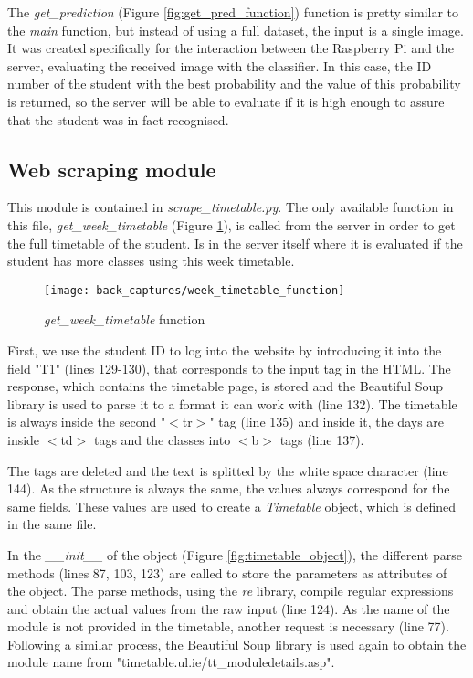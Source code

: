 	\clearpage

	The \textit{get{\_}prediction} (Figure \ref{fig:get_pred_function}) function is pretty similar to the \textit{main} function, but instead of using a full dataset, the input is a single image. It was created specifically for the interaction between the Raspberry Pi and the server, evaluating the received image with the classifier. In this case, the ID number of the student with the best probability and the value of this probability is returned, so the server will be able to evaluate if it is high enough to assure that the student was in fact recognised.

	\subsection{Web scraping module}
	\label{subsec:scraping_module}
	This module is contained in \textit{scrape{\_}timetable.py}. The only available function in this file, \textit{get{\_}week{\_}timetable} (Figure \ref{fig:get_timetable_function}), is called from the server in order to get the full timetable of the student. Is in the server itself where it is evaluated if the student has more classes using this week timetable.

	\begin{figure}[!ht]
		\centering
		\texttt{[image: back\_captures/week\_timetable\_function]}
		\caption{\textit{get{\_}week{\_}timetable} function}
		\label{fig:get_timetable_function}
	\end{figure}

	\clearpage

	First, we use the student ID to log into the website by introducing it into the field "T1" (lines 129-130), that corresponds to the input tag in the HTML. The response, which contains the timetable page, is stored and the Beautiful Soup library is used to parse it to a format it can work with (line 132). The timetable is always inside the second "$<$tr$>$" tag (line 135) and inside it, the days are inside $<$td$>$ tags and the classes into $<$b$>$ tags (line 137). 

	The tags are deleted and the text is splitted by the white space character (line 144). As the structure is always the same, the values always correspond for the same fields. These values are used to create a \textit{Timetable} object, which is defined in the same file. 

	In the \textit{{\_}{\_}init{\_}{\_}} of the object (Figure \ref{fig:timetable_object}), the different parse methods (lines 87, 103, 123) are called to store the parameters as attributes of the object. The parse methods, using the \textit{re} library, compile regular expressions and obtain the actual values from the raw input (line 124). As the name of the module is not provided in the timetable, another request is necessary (line 77). Following a similar process, the Beautiful Soup library is used again to obtain the module name from "timetable.ul.ie/tt{\_}moduledetails.asp".

